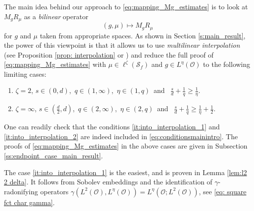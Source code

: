 \documentclass[reqno]{amsart}
\theoremstyle{plain}
\theoremstyle{remark}
\theoremstyle{plain}
\numberwithin{equation}{section}
\newcommand\cO{\mathcal{O}}
\newcommand{\g}{\gamma}
\newcommand{\1}{\one}
\newcommand{\Sf}{\mathcal{S}_{f}}
\begin{document}
The main idea behind our approach to \eqref{eq:mapping_Mg_estimates} is to look at $M_g R_\mu$ as a \emph{bilinear} operator 
\begin{equation}
\label{eq:abstract_view_point_intro}
(g,\mu)\mapsto M_gR_\mu
\end{equation} 
for $g$ and $\mu$ taken from appropriate spaces. As shown in Section \ref{s:main_result}, the power of this viewpoint is that it allows us to use \emph{multilinear interpolation} (see Proposition \ref{prop: interpolation} or \cite[Section 4.4]{BeLo}) and reduce the full proof of \eqref{eq:mapping_Mg_estimates} with $\mu\in \ell^\zeta(\Sf)$ and $g\in L^\eta(\cO)$ to the following limiting cases: 
\begin{enumerate}[{\rm(1)}]
\item\label{it:into_interpolation_1} $\zeta=2$, $s\in (0,d)$,\  $q\in (1,\infty)$,\ $\eta\in (1,q)$\ and \ $\frac{s}{d} + \frac{1}{q}  \geq \frac{1}{\eta}$.
\item\label{it:into_interpolation_2} $\zeta=\infty$,   $s\in (\frac{d}{2},d)$,\ $q\in (2,\infty)$,\ $\eta\in (2,q)$\ and \
$\frac{s}{d} + \frac{1}{q}  \geq \frac{1}{\eta} + \frac{1}{2}$.
\end{enumerate}
One can readily check that the conditions \eqref{it:into_interpolation_1} and \eqref{it:into_interpolation_2} are indeed included in \eqref{eq:conditionsmainintro}.
The proofs of \eqref{eq:mapping_Mg_estimates} in the above cases are given in Subsection \ref{ss:endpoint_case_main_result}.


\smallskip

The case \eqref{it:into_interpolation_1} is the easiest, and is proven in Lemma \ref{lem:l2 2 delta}. It follows from Sobolev embeddings and the identification of $\gamma$-radonifying operators $\g(L^2(\cO),L^\eta(\cO))=L^\eta(\cO;L^2(\cO))$, see \eqref{eq: square fct char gamma}.
\end{document}
